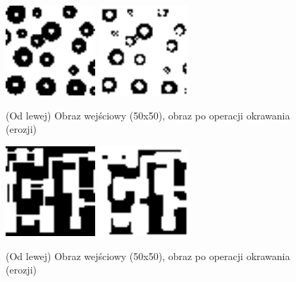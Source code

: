 \documentclass[final,a4paper,openany,12pt]{mwbk}
\begin{document}
\begin{figure}[H]
	\begin{center}
		\includegraphics[width=0.3\textwidth]{1/1Bin_E_Original}
		\includegraphics[width=0.3\textwidth]{1/1Bin_E_Result}
	\end{center}
	\caption{(Od lewej) Obraz wejściowy (50x50), obraz po operacji okrawania (erozji) }
\end{figure}

\begin{figure}[H]
	\begin{center}
		\includegraphics[width=0.3\textwidth]{2/2Bin_E_Original}
		\includegraphics[width=0.3\textwidth]{2/2Bin_E_Result}
	\end{center}
	\caption{(Od lewej) Obraz wejściowy (50x50), obraz po operacji okrawania (erozji) }
\end{figure}
\end{document}
